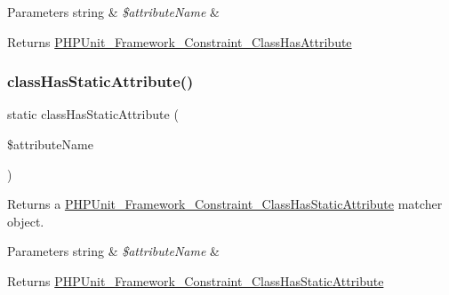 \begin{DoxyParams}[1]{Parameters}
string & {\em \$attribute\+Name} & \\
\hline
\end{DoxyParams}
\begin{DoxyReturn}{Returns}
\mbox{\hyperlink{class_p_h_p_unit___framework___constraint___class_has_attribute}{P\+H\+P\+Unit\+\_\+\+Framework\+\_\+\+Constraint\+\_\+\+Class\+Has\+Attribute}} 
\end{DoxyReturn}
\mbox{\label{class_p_h_p_unit___framework___assert_a93e3a0af829c817ea47987ca29851358}} 
\subsubsection{\texorpdfstring{class\+Has\+Static\+Attribute()}{classHasStaticAttribute()}}
{\footnotesize\ttfamily static class\+Has\+Static\+Attribute (\begin{DoxyParamCaption}\item[{}]{\$attribute\+Name }\end{DoxyParamCaption})\hspace{0.3cm}{\ttfamily [static]}}

Returns a \mbox{\hyperlink{class_p_h_p_unit___framework___constraint___class_has_static_attribute}{P\+H\+P\+Unit\+\_\+\+Framework\+\_\+\+Constraint\+\_\+\+Class\+Has\+Static\+Attribute}} matcher object.


\begin{DoxyParams}[1]{Parameters}
string & {\em \$attribute\+Name} & \\
\hline
\end{DoxyParams}
\begin{DoxyReturn}{Returns}
\mbox{\hyperlink{class_p_h_p_unit___framework___constraint___class_has_static_attribute}{P\+H\+P\+Unit\+\_\+\+Framework\+\_\+\+Constraint\+\_\+\+Class\+Has\+Static\+Attribute}} 
\end{DoxyReturn}
\mbox{\label{class_p_h_p_unit___framework___assert_a35d1fc4f774ce4d597f740e0ed43495e}} 
